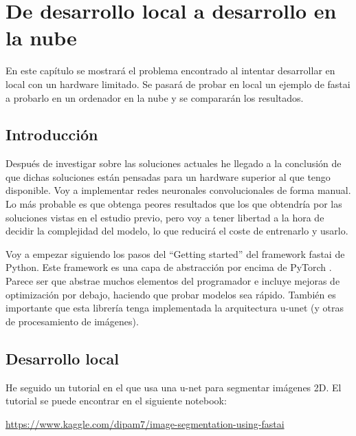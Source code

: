 \chapter{De desarrollo local a desarrollo en la nube}\label{cloudcomputing}

En este capítulo se mostrará el problema encontrado al intentar desarrollar en local con un hardware limitado. Se pasará de probar en local un ejemplo de fastai a probarlo en un ordenador en la nube y se compararán los resultados.

\section{Introducci\'on}\label{sec:intro_cloudcomputing}

Después de investigar sobre las soluciones actuales he llegado a la conclusión de que dichas soluciones están pensadas para un hardware superior al que tengo disponible. Voy a implementar redes neuronales convolucionales de forma manual. Lo más probable es que obtenga peores resultados que los que obtendría por las soluciones vistas en el estudio previo, pero voy a tener libertad a la hora de decidir la complejidad del modelo, lo que reducirá el coste de entrenarlo y usarlo. 

Voy a empezar siguiendo los pasos del “Getting started” del framework fastai \cite{Howard2018} de Python. Este framework es una capa de abstracción por encima de PyTorch \cite{Paszke2019}. Parece ser que abstrae muchos elementos del programador e incluye mejoras de optimización por debajo, haciendo que probar modelos sea rápido. También es importante que esta librería tenga implementada la arquitectura u-unet (y otras de procesamiento de imágenes).

\section{Desarrollo local}\label{sec:local_dev}

He seguido un tutorial en el que usa una u-net para segmentar imágenes 2D. El tutorial se puede encontrar en el siguiente notebook:

\url{https://www.kaggle.com/dipam7/image-segmentation-using-fastai}

